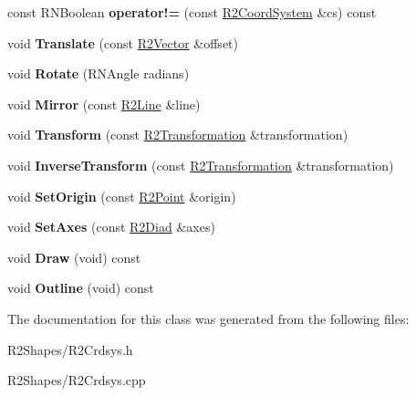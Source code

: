 \begin{DoxyCompactItemize}
\item 
const R\+N\+Boolean {\bfseries operator!=} (const \hyperlink{class_r2_coord_system}{R2\+Coord\+System} \&cs) const \hypertarget{class_r2_coord_system_ad18eae63e2954ad32339683a7dd563cd}{}\label{class_r2_coord_system_ad18eae63e2954ad32339683a7dd563cd}

\item 
void {\bfseries Translate} (const \hyperlink{class_r2_vector}{R2\+Vector} \&offset)\hypertarget{class_r2_coord_system_afd5df0cc6e8688ea6ea177d7645b70a2}{}\label{class_r2_coord_system_afd5df0cc6e8688ea6ea177d7645b70a2}

\item 
void {\bfseries Rotate} (R\+N\+Angle radians)\hypertarget{class_r2_coord_system_aa47f3348f1520313c7eb8ddca131488d}{}\label{class_r2_coord_system_aa47f3348f1520313c7eb8ddca131488d}

\item 
void {\bfseries Mirror} (const \hyperlink{class_r2_line}{R2\+Line} \&line)\hypertarget{class_r2_coord_system_a1342a17fceebe685225aa39cb1ca6018}{}\label{class_r2_coord_system_a1342a17fceebe685225aa39cb1ca6018}

\item 
void {\bfseries Transform} (const \hyperlink{class_r2_transformation}{R2\+Transformation} \&transformation)\hypertarget{class_r2_coord_system_a6bfb127197e40b2ce5a33c585898f8a0}{}\label{class_r2_coord_system_a6bfb127197e40b2ce5a33c585898f8a0}

\item 
void {\bfseries Inverse\+Transform} (const \hyperlink{class_r2_transformation}{R2\+Transformation} \&transformation)\hypertarget{class_r2_coord_system_a7af102355c312d117d09bc42650739e9}{}\label{class_r2_coord_system_a7af102355c312d117d09bc42650739e9}

\item 
void {\bfseries Set\+Origin} (const \hyperlink{class_r2_point}{R2\+Point} \&origin)\hypertarget{class_r2_coord_system_ac20b4338487935c9118ac08ebb7cc161}{}\label{class_r2_coord_system_ac20b4338487935c9118ac08ebb7cc161}

\item 
void {\bfseries Set\+Axes} (const \hyperlink{class_r2_diad}{R2\+Diad} \&axes)\hypertarget{class_r2_coord_system_ab576f95f5ad5cbc212fcb4a60140cbc5}{}\label{class_r2_coord_system_ab576f95f5ad5cbc212fcb4a60140cbc5}

\item 
void {\bfseries Draw} (void) const \hypertarget{class_r2_coord_system_a3bc4d2b8c1ab2ed6e58e45d0a3c437e8}{}\label{class_r2_coord_system_a3bc4d2b8c1ab2ed6e58e45d0a3c437e8}

\item 
void {\bfseries Outline} (void) const \hypertarget{class_r2_coord_system_acc4afbd3fa20663a37923de2cd182343}{}\label{class_r2_coord_system_acc4afbd3fa20663a37923de2cd182343}

\end{DoxyCompactItemize}


The documentation for this class was generated from the following files\+:\begin{DoxyCompactItemize}
\item 
R2\+Shapes/R2\+Crdsys.\+h\item 
R2\+Shapes/R2\+Crdsys.\+cpp\end{DoxyCompactItemize}
